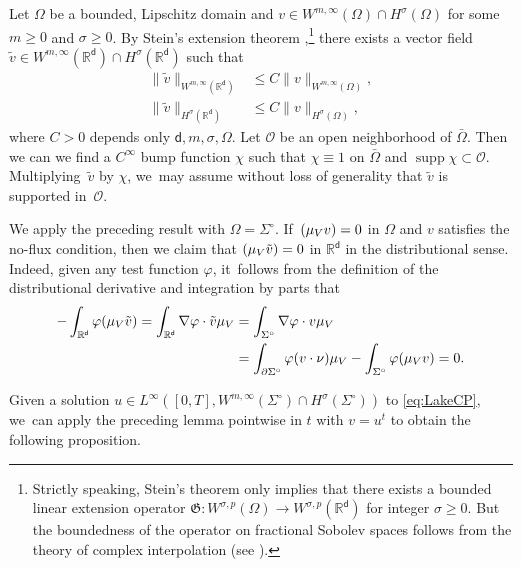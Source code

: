 \documentclass[10pt]{amsart}
\newcommand{\Sigmacirc}{\Sigma^\circ}
\theoremstyle{plain}
\theoremstyle{definition}
\DeclareMathOperator{\supp}{supp}
\let\div\relax
\DeclareMathOperator{\div}{\mathrm{div}}
\newcommand{\R}{{\mathbb{R}}}
\let\Om\Omega
\let\nab\nabla
\let\p\partial
\let\tl\tilde
\renewcommand{\d}{\mathsf{d}}
\begin{document}
Let $\Omega$ be a bounded, Lipschitz domain and $v\in W^{m,\infty}(\Omega) \cap H^\sigma(\Omega)$ for some $m\ge 0$ and $\sigma\ge 0$. By Stein's extension theorem \cite[Th.\,5, VI.3]{Stein1970},\footnote{Strictly speaking, Stein's theorem only implies that there exists a bounded linear extension operator $\mathfrak{G}: W^{\sigma,p}(\Om)\to W^{\sigma,p}(\R^\d)$ for integer $\sigma\geq 0$. But the boundedness of the operator on fractional Sobolev spaces follows from the theory of complex interpolation (\eg see \cite[Th.\,4.1.2, Th.\,6.4.5]{BL1976}).} there exists a vector field $\tl{v} \in W^{m,\infty}(\R^\d) \cap H^\sigma(\R^\d)$ such that\vspace*{-5pt}\enlargethispage{\baselineskip}
\begin{align*}
\|\tl{v}\|_{W^{m,\infty}(\R^\d)} &\le C \|v\|_{W^{m,\infty}(\Omega)}, \\
\|\tl{v}\|_{H^\sigma(\R^\d)} &\le C\|v\|_{H^\sigma(\Omega)},
\end{align*}
where $C>0$ depends only $\d,m,\sigma,\Omega$. Let $\mathcal{O}$ be an open neighborhood of $\bar\Omega$. Then we can we find a $C^\infty$ bump function $\chi$ such that $\chi\!\equiv\!1$ on $\bar\Omega$ and $\supp\chi\!\subset\!\mathcal{O}$. Multiplying~$\tl{v}$ by $\chi$, we~may assume without loss of generality that $\tl{v}$ is supported in~$\mathcal{O}$.

We apply the preceding result with $\Omega = \Sigmacirc$. If~$\div(\mu_V v) = 0$ in $\Omega$ and $v$ satisfies the no-flux condition, then we claim that $\div(\mu_V\tl{v}) = 0$ in $\R^\d$ in the distributional sense. Indeed, given any test function $\varphi$, it~follows from the definition of the distributional derivative and integration by parts that\vspace*{-2pt}
\begin{align*}
-\int_{\R^\d}\varphi \div(\mu_V\tl{v}) = \int_{\R^\d}\nab \varphi\cdot \tl{v}\mu_V &= \int_{\Sigmacirc}\nab\varphi\cdot v\mu_V\\
& = \int_{\p\Sigmacirc}\varphi (v\cdot\nu)\mu_V - \int_{\Sigmacirc}\varphi\div(\mu_V v) = 0.
\end{align*}

Given a solution $u\in L^\infty([0,T], W^{m,\infty}(\Sigmacirc)\cap H^\sigma(\Sigmacirc))$ to \eqref{eq:LakeCP}, we~can apply the preceding lemma pointwise in $t$ with $v=u^t$ to obtain the following proposition.
\end{document}
